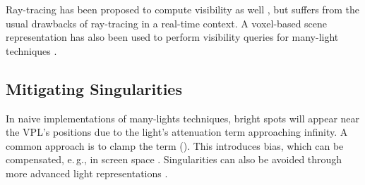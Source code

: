 Ray-tracing has been proposed to compute visibility as well \citep[e.\,g.,][]{segovia2006bidirectional}, but suffers from the usual drawbacks of ray-tracing in a real-time context. A voxel-based scene representation has also been used to perform visibility queries for many-light techniques \citep{sun2015manylightsSVO}.


\subsection{Mitigating Singularities}
\label{sec:intro:relatedWorkManyLight:singularities}

In naive implementations of many-lights techniques, bright spots will appear near the VPL’s positions due to the light’s attenuation term approaching infinity. A common approach is to clamp the term (). This introduces bias, which can be compensated, e.\,g., in screen space \citep{novak2011screen}. Singularities can also be avoided through more advanced light representations \citep{tokuyoshi2015vsgl}.


\cleardoublepage
